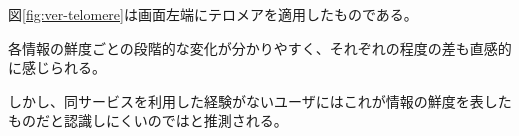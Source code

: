 図\ref{fig:ver-telomere}は画面左端にテロメアを適用したものである。

各情報の鮮度ごとの段階的な変化が分かりやすく、それぞれの程度の差も直感的に感じられる。

しかし、同サービスを利用した経験がないユーザにはこれが情報の鮮度を表したものだと認識しにくいのではと推測される。

